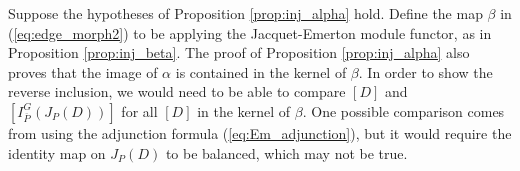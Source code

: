 \documentclass[10pt]{amsart}
\begin{document}
\begin{remark}
Suppose the hypotheses of Proposition \ref{prop:inj_alpha} hold. Define the map $\beta$ in (\ref{eq:edge_morph2}) to be applying the Jacquet-Emerton module functor, as in Proposition \ref{prop:inj_beta}. The proof of Proposition \ref{prop:inj_alpha} also proves that the image of $\alpha$ is contained in the kernel of $\beta$. In order to show the reverse inclusion, we would need to be able to compare $[D]$ and $[I_{\overline{P}}^{G}(J_P(D))]$ for all $[D]$ in the kernel of $\beta$. One possible comparison comes from using the adjunction formula (\ref{eq:Em_adjunction}), but it would require the identity map on $J_P(D)$ to be balanced, which may not be true. 
\end{remark}




\vspace{3mm}
\end{document}
